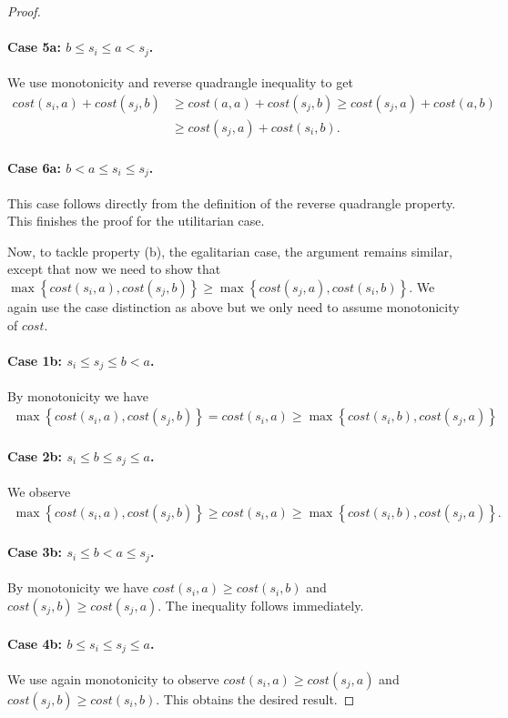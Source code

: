 \documentclass[a4paper,UKenglish,cleveref, autoref, thm-restate]{lipics-v2021}
\newcommand{\cost}{\mathit{cost}}
\begin{document}
\begin{proof}
\paragraph*{Case 5a: $b \leq s_i \leq a < s_j$.}
We use monotonicity and reverse quadrangle inequality to get
\begin{align*}
    \cost(s_i,a) + \cost(s_j,b) &\geq \cost(a,a) + \cost(s_j,b) \geq \cost(s_j,a) + \cost(a,b)\\
    &\geq \cost(s_j,a) + \cost(s_i,b).
\end{align*}
\paragraph*{Case 6a: $b < a \leq s_i \leq s_j$.}
This case follows directly from the definition of the reverse quadrangle property. This finishes the proof for the utilitarian case.

Now, to tackle property (b), the egalitarian case, the argument remains similar, except that now we need to show that $\max \left\{\cost(s_i,a), \cost(s_j,b)\right\} \geq \max \left\{\cost(s_j,a), \cost(s_i,b)\right\}$. We again use the case distinction as above but we only need to assume monotonicity of $\cost$.

\paragraph*{Case 1b: $s_i \leq s_j \leq b < a$.}
 By monotonicity we have
 \begin{align*}
     \max \left\{\cost(s_i,a), \cost(s_j,b)\right\} = \cost(s_i,a) \geq \max\left\{\cost(s_i, b), \cost(s_j,a)\right\}
 \end{align*}
\paragraph*{Case 2b: $s_i \leq b \leq s_j \leq a$.}
We observe
 \begin{align*}
     \max \left\{\cost(s_i,a), \cost(s_j,b)\right\} \geq \cost(s_i,a) \geq \max\left\{\cost(s_i, b), \cost(s_j,a)\right\}.
 \end{align*}
\paragraph*{Case 3b: $s_i \leq b < a \leq s_j$.}
By monotonicity we have $\cost(s_i,a)\geq \cost(s_i,b)$ and $\cost(s_j,b) \geq \cost(s_j,a)$. The inequality follows immediately.
\paragraph*{Case 4b: $b \leq s_i \leq s_j \leq a$.}
We use again monotonicity to observe $\cost(s_i,a) \geq \cost(s_j,a)$ and $\cost(s_j,b) \geq \cost(s_i,b)$. This obtains the desired result.

\end{proof}
\end{document}

